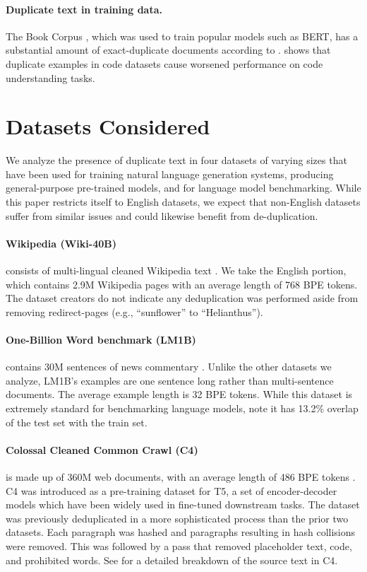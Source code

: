 \paragraph{Duplicate text in training data.}
The Book Corpus \citep{zhu2015aligning}, which was used to train popular models such as BERT, has a substantial amount of exact-duplicate documents according to \citet{bandy2021addressing}.
\citet{allamanis2019adverse} shows that duplicate examples in code datasets cause worsened performance on code understanding tasks.

\section{Datasets Considered}
We analyze the presence of duplicate text in four datasets of varying sizes that have been used for training natural language generation systems, producing general-purpose pre-trained models, and for language model benchmarking.
While this paper restricts itself to English datasets, we expect that non-English datasets suffer from similar issues and could likewise benefit from de-duplication.

\paragraph{Wikipedia (Wiki-40B)}
consists of multi-lingual cleaned Wikipedia text \citep{guo2020wiki40b}.
We take the English portion, which contains 2.9M Wikipedia pages with an average length of 768 BPE tokens.
The dataset creators do not indicate any deduplication was performed aside from removing redirect-pages (e.g., ``sunflower'' to ``Helianthus'').

\paragraph{One-Billion Word benchmark (LM1B)}  contains 30M sentences of news commentary \citep{chelba2013one}.
Unlike the other datasets we analyze, LM1B's examples are one sentence long rather than multi-sentence documents.
The average example length is 32 BPE tokens.
While this dataset is extremely standard for benchmarking language models, \citet[Sec 4]{radford2019language} note it has 13.2\% overlap of the test set with the train set.

\paragraph{Colossal Cleaned Common Crawl (C4)}
is made up of 360M web documents, with an average length of 486 BPE tokens \citep{raffel2019exploring}.
C4 was introduced as a pre-training dataset for T5, a set of encoder-decoder models which have been widely used in fine-tuned downstream tasks.
The dataset was previously deduplicated in a more sophisticated process
than the prior two datasets.
Each paragraph was hashed and paragraphs resulting in hash collisions were removed.
This was followed by a pass that removed placeholder text, code, and prohibited words.
See \citet{dodge2021documenting} for a detailed breakdown of the source text in C4.


